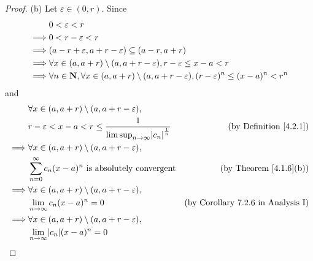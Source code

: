 \begin{proof}{(b)}
    Let \(\varepsilon \in (0, r)\).
    Since
    \begin{align*}
                 & 0 < \varepsilon < r                                                                                                     \\
        \implies & 0 < r - \varepsilon < r                                                                                                 \\
        \implies & (a - r + \varepsilon, a + r - \varepsilon) \subseteq (a - r, a + r)                                                     \\
        \implies & \forall x \in (a, a + r) \setminus (a, a + r - \varepsilon), r - \varepsilon \leq x - a < r                             \\
        \implies & \forall n \in \mathbf{N}, \forall x \in (a, a + r) \setminus (a, a + r - \varepsilon), (r - \varepsilon)^n \leq (x - a)^n < r^n
    \end{align*}
    and
    \begin{align*}
                 & \forall x \in (a, a + r) \setminus (a, a + r - \varepsilon),                                                                        \\
                 & r - \varepsilon < x - a < r \leq \frac{1}{\limsup_{n \to \infty} \abs{c_n}^\frac{1}{n}} & \text{(by Definition \ref{4.2.1})}        \\
        \implies & \forall x \in (a, a + r) \setminus (a, a + r - \varepsilon),                                                                        \\
                 & \sum_{n = 0}^\infty c_n (x - a)^n \text{ is absolutely convergent}                      & \text{(by Theorem \ref{4.1.6}(b))}        \\
        \implies & \forall x \in (a, a + r) \setminus (a, a + r - \varepsilon),                                                                        \\
                 & \lim_{n \to \infty} c_n (x - a)^n = 0                                                   & \text{(by Corollary 7.2.6 in Analysis I)} \\
        \implies & \forall x \in (a, a + r) \setminus (a, a + r - \varepsilon),                                                                        \\
                 & \lim_{n \to \infty} \abs{c_n} (x - a)^n = 0                                                                                         \\

\end{align*}
\end{proof}
